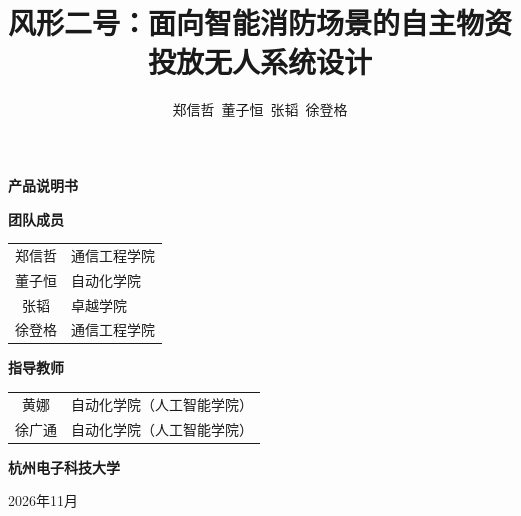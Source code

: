 \documentclass{ctexart}
\title{\textbf{风形二号：面向智能消防场景的自主物资投放无人系统设计}}
\author{郑信哲\ 董子恒\ 张韬\ 徐登格}
\date{}
\begin{document}
\begin{titlepage}
\centering

\vspace*{2cm}

{\fontsize{48}{56}\bfseries 产\hspace{0.5em}品\hspace{0.5em}说\hspace{0.5em}明\hspace{0.5em}书\par}
\vspace{2.5cm}

{\Large\bfseries 团队成员\par}
\vspace{0.4cm}
{\Large
\begin{tabular}{cl}
郑信哲 & 通信工程学院 \\
董子恒 & 自动化学院 \\
张韬   & 卓越学院 \\
徐登格 & 通信工程学院 \\
\end{tabular}
\par}
\vspace{1.5cm}

{\Large\bfseries 指导教师\par}
\vspace{0.3cm}
{\Large
\begin{tabular}{cl}
黄娜   & 自动化学院（人工智能学院） \\
徐广通 & 自动化学院（人工智能学院） \\
\end{tabular}
\par}
\vspace{4cm}

{\LARGE\bfseries 杭州电子科技大学\par}


\vfill
{\large 2026年11月\par}
\end{titlepage}

\clearpage
\setcounter{tocdepth}{2}
\tableofcontents
\clearpage


\clearpage


\clearpage

% 
% 
% 
% 
% 
% 



\end{document}
